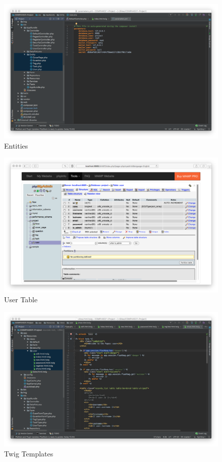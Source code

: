 \begin{figure}[htbp]
   \centering
   \includegraphics[width=400pt]{figures/entities.png} %
   \caption{Entities}
   \label{fig:Entities}
\end{figure}

\begin{figure}[htbp]
   \centering
   \includegraphics[width=400pt]{figures/tables_user_entity.png} %
   \caption{User Table}
   \label{fig:User Table}
\end{figure}

\begin{figure}[htbp]
   \centering
   \includegraphics[width=400pt]{figures/templates.png} %
   \caption{Twig Templates}
   \label{fig:Twig Templates}
\end{figure}

